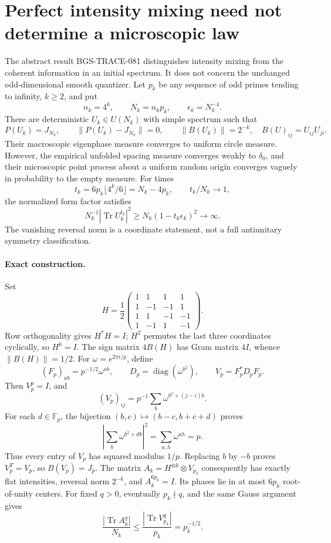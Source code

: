 \section{Perfect intensity mixing need not determine a microscopic law}
\label{sec:flat-spectral-obstruction-20261014}

The abstract result BGS-TRACE-081 distinguishes intensity mixing from
the coherent information in an initial spectrum.  It does not concern
the unchanged odd-dimensional smooth quantizer.  Let \(p_k\) be any
sequence of odd primes tending to infinity, \(k\ge2\), and put
\[
n_k=4^k,\qquad N_k=n_kp_k,\qquad \epsilon_k=N_k^{-4}.
\]
There are deterministic \(U_k\in U(N_k)\) with simple spectrum such that
\[
P(U_k)=J_{N_k},\qquad
\|P(U_k)-J_{N_k}\|=0,\qquad
\|B(U_k)\|=2^{-k},\quad B(U)_{ij}=U_{ij}\overline{U_{ji}}.
\]
Their macroscopic eigenphase measure converges to uniform circle measure.
However, the empirical unfolded spacing measure converges weakly to
\(\delta_0\), and their microscopic point process about a uniform random
origin converges vaguely in probability to the empty measure.  For times
\[
t_k=6p_k\lfloor 4^k/6\rfloor=N_k-4p_k,\qquad t_k/N_k\longrightarrow1,
\]
the normalized form factor satisfies
\[
N_k^{-1}|\operatorname{Tr}U_k^{t_k}|^2
       \ge N_k(1-t_k\epsilon_k)^2\longrightarrow\infty.
\]
The vanishing reversal norm is a coordinate statement, not a full
antiunitary symmetry classification.

\paragraph{Exact construction.}
Set
\[
H=\frac12\begin{pmatrix}
1&1&1&1\\1&-1&-1&1\\1&1&-1&-1\\1&-1&1&-1
\end{pmatrix}.
\]
Row orthogonality gives \(H^*H=I\); \(H^2\) permutes the last three
coordinates cyclically, so \(H^6=I\).  The sign matrix \(4B(H)\) has
Gram matrix \(4I\), whence \(\|B(H)\|=1/2\).
For \(\omega=e^{2\pi i/p}\), define
\[
(F_p)_{ab}=p^{-1/2}\omega^{ab},\qquad
D_p=\operatorname{diag}(\omega^{b^2}),\qquad V_p=F_p^*D_pF_p .
\]
Then \(V_p^p=I\), and
\[
(V_p)_{ij}=p^{-1}\sum_b\omega^{b^2+(j-i)b}.
\]
For each \(d\in\mathbb F_p\), the bijection
\((b,c)\mapsto (b-c,b+c+d)\) proves
\[
\left|\sum_b\omega^{b^2+db}\right|^2
   =\sum_{a,h}\omega^{ah}=p.
\]
Thus every entry of \(V_p\) has squared modulus \(1/p\).
Replacing \(b\) by \(-b\) proves \(V_p^T=V_p\), so \(B(V_p)=J_p\).
The matrix \(A_k=H^{\otimes k}\otimes V_{p_k}\) consequently has
exactly flat intensities, reversal norm \(2^{-k}\), and
\(A_k^{6p_k}=I\).  Its phases lie in at most \(6p_k\) root-of-unity
centers.  For fixed \(q>0\), eventually \(p_k\nmid q\), and the same
Gauss argument gives
\[
\frac{|\operatorname{Tr}A_k^q|}{N_k}
 \le \frac{|\operatorname{Tr}V_{p_k}^q|}{p_k}=p_k^{-1/2}.
\]

